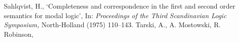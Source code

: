 \documentclass[draft]{article}
\def\S{\mathbf{S}}
\begin{document}
\begin{thebibliography}{}
%
%
%
%
%
%
%
%
%
%
%
%
{\sc Sahlqvist,} H.,
`Completeness and correspondence in the first and second order semantics for modal logic',
In: \emph{Proceedings of the Third Scandinavian Logic Symposium,}\/
North-Holland (1975) 110--143.
%
%
%
%
%
%
%
%
%
%
%
%
%
%
%
%
%
%
{\sc Tarski,} A., A. {\sc Mostowski,} R. {\sc Robinson,}

\end{thebibliography}
\end{document}
